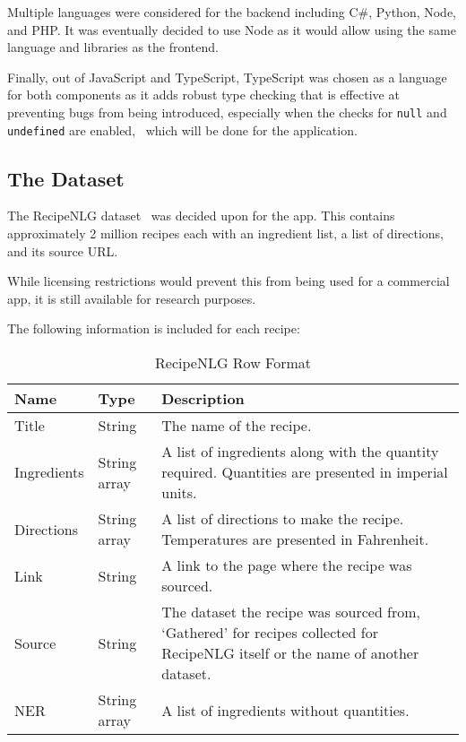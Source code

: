 Multiple languages were considered for the backend including C\#, Python, Node,
and PHP. It was eventually decided to use Node as it would allow using the same
language and libraries as the frontend.

Finally, out of JavaScript and TypeScript, TypeScript was chosen as a language
for both components as it adds robust type checking that is effective at preventing
bugs from being introduced, especially when the checks for \texttt{null} and
\texttt{undefined} are enabled,~\cite{gao_type_2017} which will be done for
the application.

\subsection{The Dataset}\label{sec:data_pre_process}


The RecipeNLG dataset~\cite{bien_recipenlg_2020} was decided upon for the \chef{} app. This contains approximately 2 million recipes
each with an ingredient list, a list of directions, and its source URL.

While licensing restrictions would prevent this from being used for a commercial app, it is still available for
research purposes.

The following information is included for each recipe:

\begin{table}[h!]
    \caption{RecipeNLG Row Format}\label{tab:recipenlg_row_format}

    \begin{tabulary}{\textwidth}{llL}
        \toprule
        \textbf{Name} & \textbf{Type} & \textbf{Description} \\\midrule

        Title & String & The name of the recipe.\\

        Ingredients & String array & A list of ingredients along with the quantity required. Quantities are presented in imperial units.\\

        Directions & String array & A list of directions to make the recipe. Temperatures are presented in Fahrenheit.\\

        Link & String & A link to the page where the recipe was sourced.\\

        Source & String & The dataset the recipe was sourced from, \enquote*{Gathered} for recipes collected for RecipeNLG itself or the name of another dataset.\\

        NER & String array & A list of ingredients without quantities.\\
        \bottomrule
    \end{tabulary}
\end{table}

